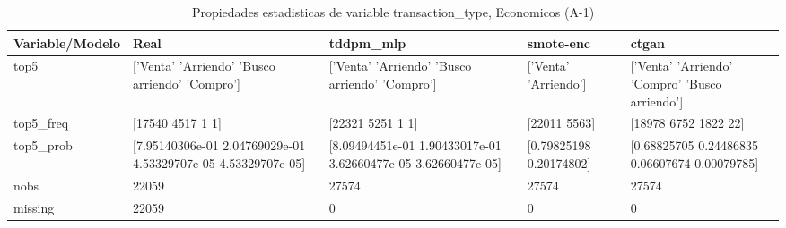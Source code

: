 \begin{table}[H]
\centering
\fontsize{8}{14}\selectfont
\caption{Propiedades  estadisticas de variable transaction\_type, Economicos (A-1)}
\label{table-stats-economicos-a-1-transaction_type}
\begin{tabular}{|l|m{10em}|m{10em}|m{10em}|m{10em}|}
\hline
 \rowcolor[gray]{0.8}
Variable/Modelo & Real & tddpm\_mlp & smote-enc & ctgan \\
\hline top5 & ['Venta' 'Arriendo' 'Busco arriendo' 'Compro'] & ['Venta' 'Arriendo' 'Busco arriendo' 'Compro'] & ['Venta' 'Arriendo'] & ['Venta' 'Arriendo' 'Compro' 'Busco arriendo'] \\
\hline top5\_freq & [17540  4517     1     1] & [22321  5251     1     1] & [22011  5563] & [18978  6752  1822    22] \\
\hline top5\_prob & [7.95140306e-01 2.04769029e-01 4.53329707e-05 4.53329707e-05] & [8.09494451e-01 1.90433017e-01 3.62660477e-05 3.62660477e-05] & [0.79825198 0.20174802] & [0.68825705 0.24486835 0.06607674 0.00079785] \\
\hline nobs & 22059 & 27574 & 27574 & 27574 \\
\hline missing & 22059 & 0 & 0 & 0 \\
\hline
\end{tabular}
\end{table}
